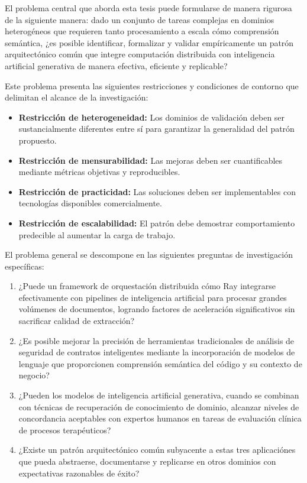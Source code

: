 \documentclass[12pt,a4paper,twoside]{book}
\begin{document}
El problema central que aborda esta tesis puede formularse de manera rigurosa de la siguiente manera: dado un conjunto de tareas complejas en dominios heterogéneos que requieren tanto procesamiento a escala cómo comprensión semántica, ¿es posible identificar, formalizar y validar empíricamente un patrón arquitectónico común que integre computación distribuida con inteligencia artificial generativa de manera efectiva, eficiente y replicable?

Este problema presenta las siguientes restricciones y condiciones de contorno que delimitan el alcance de la investigación:

\begin{itemize}
    \item \textbf{Restricción de heterogeneidad:} Los dominios de validación deben ser sustancialmente diferentes entre sí para garantizar la generalidad del patrón propuesto.
    \item \textbf{Restricción de mensurabilidad:} Las mejoras deben ser cuantificables mediante métricas objetivas y reproducibles.
    \item \textbf{Restricción de practicidad:} Las soluciones deben ser implementables con tecnologías disponibles comercialmente.
    \item \textbf{Restricción de escalabilidad:} El patrón debe demostrar comportamiento predecible al aumentar la carga de trabajo.
\end{itemize}

El problema general se descompone en las siguientes preguntas de investigación específicas:

\begin{enumerate}[label=\textbf{PI\arabic*.}]
    \item ¿Puede un framework de orquestación distribuida cómo Ray integrarse efectivamente con pipelines de inteligencia artificial para procesar grandes volúmenes de documentos, logrando factores de aceleración significativos sin sacrificar calidad de extracción?
    
    \item ¿Es posible mejorar la precisión de herramientas tradicionales de análisis de seguridad de contratos inteligentes mediante la incorporación de modelos de lenguaje que proporcionen comprensión semántica del código y su contexto de negocio?
    
    \item ¿Pueden los modelos de inteligencia artificial generativa, cuando se combinan con técnicas de recuperación de conocimiento de dominio, alcanzar niveles de concordancia aceptables con expertos humanos en tareas de evaluación clínica de procesos terapéuticos?
    
    \item ¿Existe un patrón arquitectónico común subyacente a estas tres aplicaciónes que pueda abstraerse, documentarse y replicarse en otros dominios con expectativas razonables de éxito?
\end{enumerate}
\end{document}
